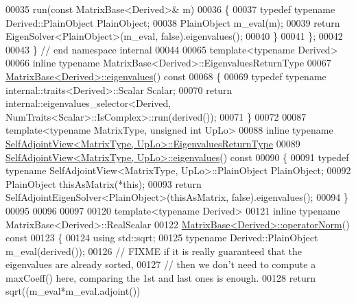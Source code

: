 \begin{DoxyCode}
00035   run(\textcolor{keyword}{const} MatrixBase<Derived>& m)
00036   \{
00037     \textcolor{keyword}{typedef} \textcolor{keyword}{typename} Derived::PlainObject PlainObject;
00038     PlainObject m\_eval(m);
00039     \textcolor{keywordflow}{return} EigenSolver<PlainObject>(m\_eval, \textcolor{keyword}{false}).eigenvalues();
00040   \}
00041 \};
00042 
00043 \} \textcolor{comment}{// end namespace internal}
00044 
00065 \textcolor{keyword}{template}<\textcolor{keyword}{typename} Derived>
00066 \textcolor{keyword}{inline} \textcolor{keyword}{typename} MatrixBase<Derived>::EigenvaluesReturnType
00067 \hyperlink{group___core___module_a30430fa3d5b4e74d312fd4f502ac984d}{MatrixBase<Derived>::eigenvalues}()\textcolor{keyword}{ const}
00068 \textcolor{keyword}{}\{
00069   \textcolor{keyword}{typedef} \textcolor{keyword}{typename} internal::traits<Derived>::Scalar Scalar;
00070   \textcolor{keywordflow}{return} internal::eigenvalues\_selector<Derived, NumTraits<Scalar>::IsComplex>::run(derived());
00071 \}
00072 
00087 \textcolor{keyword}{template}<\textcolor{keyword}{typename} MatrixType, \textcolor{keywordtype}{unsigned} \textcolor{keywordtype}{int} UpLo> 
00088 \textcolor{keyword}{inline} \textcolor{keyword}{typename} \hyperlink{group___core___module_a8ae92703d920130b38a383f8b165146c}{SelfAdjointView<MatrixType, UpLo>::EigenvaluesReturnType}
00089 \hyperlink{group___core___module_ad4f34424b4ea12de9bbc5623cb938b4f}{SelfAdjointView<MatrixType, UpLo>::eigenvalues}()\textcolor{keyword}{ const}
00090 \textcolor{keyword}{}\{
00091   \textcolor{keyword}{typedef} \textcolor{keyword}{typename} SelfAdjointView<MatrixType, UpLo>::PlainObject PlainObject;
00092   PlainObject thisAsMatrix(*\textcolor{keyword}{this});
00093   \textcolor{keywordflow}{return} SelfAdjointEigenSolver<PlainObject>(thisAsMatrix, \textcolor{keyword}{false}).eigenvalues();
00094 \}
00095 
00096 
00097 
00120 \textcolor{keyword}{template}<\textcolor{keyword}{typename} Derived>
00121 \textcolor{keyword}{inline} \textcolor{keyword}{typename} MatrixBase<Derived>::RealScalar
00122 \hyperlink{group___core___module_a0ff9bc0b9bea2d0822a2bf3192783102}{MatrixBase<Derived>::operatorNorm}()\textcolor{keyword}{ const}
00123 \textcolor{keyword}{}\{
00124   \textcolor{keyword}{using} std::sqrt;
00125   \textcolor{keyword}{typename} Derived::PlainObject m\_eval(derived());
00126   \textcolor{comment}{// FIXME if it is really guaranteed that the eigenvalues are already sorted,}
00127   \textcolor{comment}{// then we don't need to compute a maxCoeff() here, comparing the 1st and last ones is enough.}
00128   \textcolor{keywordflow}{return} sqrt((m\_eval*m\_eval.adjoint())

\end{DoxyCode}
